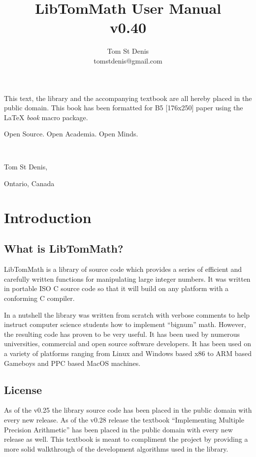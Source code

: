 \documentclass[synpaper]{book}
\begin{document}
\frontmatter
\pagestyle{empty}
\title{LibTomMath User Manual \\ v0.40}
\author{Tom St Denis \\ tomstdenis@gmail.com}
\maketitle
This text, the library and the accompanying textbook are all hereby placed in the public domain.  This book has been 
formatted for B5 [176x250] paper using the \LaTeX{} {\em book} macro package.

\vspace{10cm}

\begin{flushright}Open Source.  Open Academia.  Open Minds.

\mbox{ }

Tom St Denis,

Ontario, Canada
\end{flushright}

\tableofcontents
\listoffigures
\mainmatter
\pagestyle{headings}
\chapter{Introduction}
\section{What is LibTomMath?}
LibTomMath is a library of source code which provides a series of efficient and carefully written functions for manipulating
large integer numbers.  It was written in portable ISO C source code so that it will build on any platform with a conforming
C compiler.  

In a nutshell the library was written from scratch with verbose comments to help instruct computer science students how
to implement ``bignum'' math.  However, the resulting code has proven to be very useful.  It has been used by numerous 
universities, commercial and open source software developers.  It has been used on a variety of platforms ranging from
Linux and Windows based x86 to ARM based Gameboys and PPC based MacOS machines.  

\section{License}
As of the v0.25 the library source code has been placed in the public domain with every new release.  As of the v0.28
release the textbook ``Implementing Multiple Precision Arithmetic'' has been placed in the public domain with every new
release as well.  This textbook is meant to compliment the project by providing a more solid walkthrough of the development
algorithms used in the library.
\end{document}
